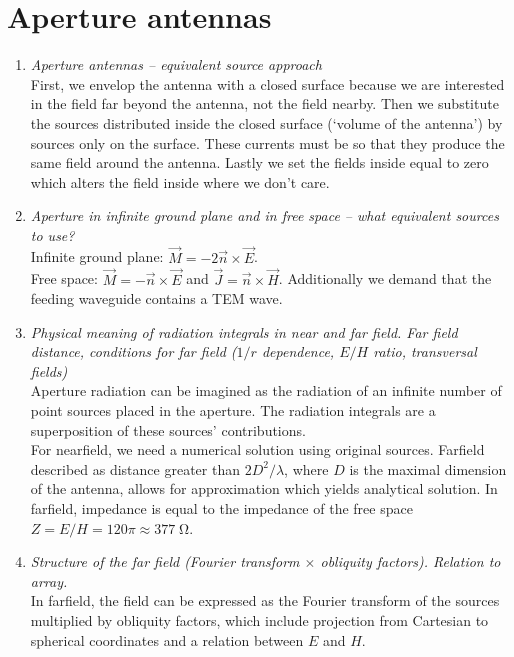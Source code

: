 \documentclass[11pt,a4paper]{article}
\renewcommand{\ohm}{{\mathrm{\Omega}}}
\begin{document}
\newpage\section{Aperture antennas}
\begin{enumerate}

    \item \emph{Aperture antennas -- equivalent source approach}\\
    First, we envelop the antenna with a closed surface because we are interested in the field far beyond the antenna, not the field nearby. Then we substitute the sources distributed inside the closed surface (`volume of the antenna') by sources only on the surface. These currents must be so that they produce the same field around the antenna. Lastly we set the fields inside equal to zero which alters the field inside where we don't care. 
    
    \item \emph{Aperture in infinite ground plane and in free space -- what equivalent sources to use?}\\
    Infinite ground plane: $\vec M = -2\vec n \times \vec E$.\\
    Free space: $\vec M = -\vec n \times \vec E$ and $\vec J = \vec n \times \vec H$. Additionally we demand that the feeding waveguide contains a TEM wave.
    
    \item \emph{Physical meaning of radiation integrals in near and far field. Far field distance, conditions for far field ($1/r$ dependence, $E/H$ ratio, transversal fields)}\\
    Aperture radiation can be imagined as the radiation of an infinite number of point sources placed in the aperture. The radiation integrals are a superposition of these sources' contributions.\\
    For nearfield, we need a numerical solution using original sources. Farfield described as distance greater than $2D^2/\lambda$, where $D$ is the maximal dimension of the antenna, allows for approximation which yields analytical solution. In farfield, impedance is equal to the impedance of the free space $Z = E/H = 120\pi \approx 377 \; \ohm$.
    
    \item \emph{Structure of the far field (Fourier transform $\times$ obliquity factors). Relation to array.}\\
    In farfield, the field can be expressed as the Fourier transform of the sources multiplied by obliquity factors, which include projection from Cartesian to spherical coordinates and a relation between $E$ and $H$.


\end{enumerate}
\end{document}
